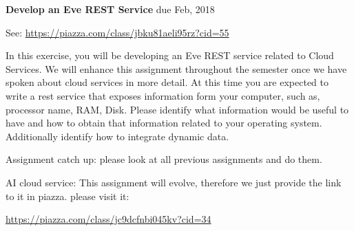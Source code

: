 \begin{exercise} {\bf Develop an Eve REST Service} due Feb, 2018

See: \url{https://piazza.com/class/jbku81aeli95rz?cid=55}

In this exercise, you will be developing an Eve REST service related
to Cloud Services. We will enhance this assignment throughout the
semester once we have spoken about cloud services in more detail. At
this time you are expected to write a rest service that exposes
information form your computer, such as, processor name, RAM,
Disk. Please identify what information would be useful to have and how
to obtain that information related to your operating system. Additionally identify how to integrate dynamic data.

\end{exercise}

\begin{exercise}
Assignment catch up: please look at all previous assignments and do
them. 
\end{exercise}

\begin{exercise}

AI cloud service: This assignment will evolve, therefore we just
provide the link to it in piazza. please visit it:

\url{https://piazza.com/class/jc9dcfnbi045kv?cid=34}
\end{exercise}

